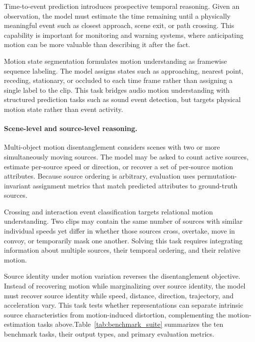 \documentclass{article}
\begin{document}
Time-to-event prediction introduces prospective temporal reasoning. 
Given an observation, the model must estimate the time remaining until a physically meaningful event such as closest approach, scene exit, or path crossing. 
This capability is important for monitoring and warning systems, where anticipating motion can be more valuable than describing it after the fact.

Motion state segmentation formulates motion understanding as framewise sequence labeling. 
The model assigns states such as approaching, nearest point, receding, stationary, or occluded to each time frame rather than assigning a single label to the clip. 
This task bridges audio motion understanding with structured prediction tasks such as sound event detection, but targets physical motion state rather than event activity.

\paragraph{Scene-level and source-level reasoning.}
Multi-object motion disentanglement considers scenes with two or more simultaneously moving sources. 
The model may be asked to count active sources, estimate per-source speed or direction, or recover a set of per-source motion attributes. 
Because source ordering is arbitrary, evaluation uses permutation-invariant assignment metrics that match predicted attributes to ground-truth sources.

Crossing and interaction event classification targets relational motion understanding. 
Two clips may contain the same number of sources with similar individual speeds yet differ in whether those sources cross, overtake, move in convoy, or temporarily mask one another. 
Solving this task requires integrating information about multiple sources, their temporal ordering, and their relative motion.

Source identity under motion variation reverses the disentanglement objective. 
Instead of recovering motion while marginalizing over source identity, the model must recover source identity while speed, distance, direction, trajectory, and acceleration vary. 
This task tests whether representations can separate intrinsic source characteristics from motion-induced distortion, complementing the motion-estimation tasks above.Table~\ref{tab:benchmark_suite} summarizes the ten benchmark tasks, their output types, and primary evaluation metrics.
\end{document}
